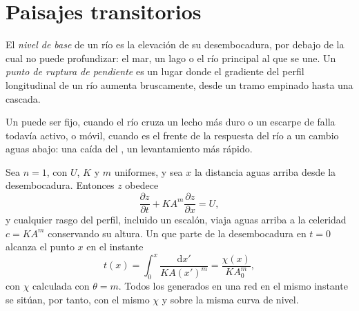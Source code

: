 \section{Paisajes transitorios}\label{sec:b3:quantitative-geomorphology:transient}

\begin{definition}\label{def:b3:quantitative-geomorphology:knickpoint}
El \emph{nivel de base} de un río es la elevación de su
desembocadura, por debajo de la cual no puede profundizar: el mar, un lago o el río principal al que
se une. Un \emph{punto de ruptura de pendiente} es un lugar donde el gradiente
del perfil longitudinal de un río aumenta bruscamente, desde un tramo empinado hasta una
cascada.
\end{definition}

Un  puede ser fijo, cuando el río cruza un lecho más duro o un
escarpe de falla todavía activo, o móvil, cuando es el frente de la
respuesta del río a un cambio aguas abajo: una caída del , un
levantamiento más rápido.

\begin{theorem}\label{thm:b3:quantitative-geomorphology:kinematic}
Sea $n = 1$, con $U$, $K$ y $m$ uniformes, y sea $x$ la distancia
aguas arriba desde la desembocadura. Entonces $z$ obedece
\[
\frac{\partial z}{\partial t} + K A^m \frac{\partial z}{\partial x} = U ,
\]
y cualquier rasgo del perfil, incluido un escalón, viaja aguas arriba a la
celeridad $c = K A^m$ conservando su altura. Un  que parte de
la desembocadura en $t = 0$ alcanza el punto $x$ en el instante
\[
t(x) = \int_0^x \frac{\mathrm{d}x'}{K A(x')^m} = \frac{\chi(x)}{K A_0^m},
\]
con $\chi$ calculada con $\theta = m$. Todos los  generados en una red
en el mismo instante se sitúan, por tanto, con el mismo $\chi$ y sobre la misma curva de nivel.
\end{theorem}


